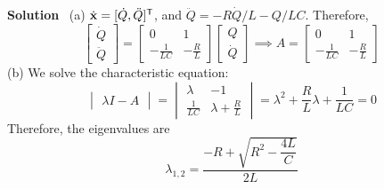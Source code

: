 \documentclass[hidelinks]{article}
\begin{document}
\vspace{5mm}
\noindent
\textbf{Solution} \, (a) $\dot{\vb{x}} = [\dot{Q},\ddot{Q}]^{\mathsf{T}}$, and $\ddot{Q} = -R\dot{Q}/L - Q/LC$. Therefore,
$$
\begin{bmatrix}
    \dot{Q} \\
    \ddot{Q}
\end{bmatrix}
=
\begin{bmatrix}
    0 & 1 \\
    -\frac{1}{LC} & -\frac{R}{L} 
\end{bmatrix}
\begin{bmatrix}
    Q \\
    \dot{Q}
\end{bmatrix}
\implies A = 
\begin{bmatrix}
    0 & 1 \\
    -\frac{1}{LC} & -\frac{R}{L} 
\end{bmatrix}
$$
(b) We solve the characteristic equation:
$$
\begin{vmatrix}
    \lambda I-A
\end{vmatrix}
=
\begin{vmatrix}
    \lambda & -1 \\
    \frac{1}{LC} & \lambda+\frac{R}{L}
\end{vmatrix}
= \lambda^2 + \frac{R}{L}\lambda + \frac{1}{LC} = 0
$$
Therefore, the eigenvalues are
$$\lambda_{1,2} = \frac{-R+\sqrt{R^2-\dfrac{4L}{C}}}{2L}$$
\end{document}

